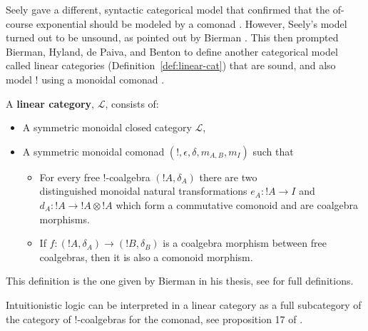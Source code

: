 \documentclass{elsarticle}
\begin{document}
Seely gave a different, syntactic categorical model that confirmed
that the of-course exponential should be modeled by a comonad
\cite{Seely:1989}.  However, Seely's model turned out to be unsound,
as pointed out by Bierman \cite{Bierman:1994}.  This then prompted
Bierman, Hyland, de Paiva, and Benton to define another categorical
model called linear categories (Definition~\ref{def:linear-cat}) that
are sound, and also model $!$ using a monoidal comonad
\cite{Bierman:1994}.  
\begin{definition}
  \label{def:linear-cat}
  A \textbf{linear category}, $\mathcal{L}$, consists of:
  \begin{center}
    \begin{itemize}
    \item A symmetric monoidal closed category $\mathcal{L}$,
    \item A symmetric monoidal comonad $(!, \epsilon, \delta, m_{A,B},
      m_I)$ such that 
      \begin{itemize}
      \item For every free $!$-coalgebra $(!A,\delta_A)$ there are two\\
        distinguished monoidal natural transformations $e_A : !A \to
        I$ and $d_A : !A \to !A \otimes !A$ which form a commutative
        comonoid and are coalgebra morphisms.
      \item If $f : (!A,\delta_A) \to (!B,\delta_B)$ is a coalgebra
        morphism between free coalgebras, then it is also a comonoid
        morphism.
      \end{itemize}
    \end{itemize}
  \end{center}
  This definition is the one given by Bierman in his thesis, see
  \cite{Bierman:1994} for full definitions.
\end{definition}
\noindent
Intuitionistic logic can be interpreted in a linear category as a
full subcategory of the category of $!$-coalgebras for the comonad,
see proposition 17 of \cite{Bierman:1994}.
\end{document}
